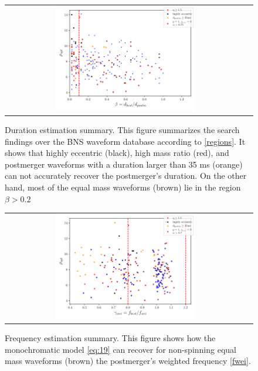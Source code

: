 \begin{figure}[hbt!]
\begin{center}
\begin{tabular}{cc}
\includegraphics[width=0.6\textwidth, angle=0]{images/Data_analysis/results/alpha_sum1.pdf}
\end{tabular}
\captionsetup{width=0.8\textwidth}
\caption[Duration estimation summary]
{Duration estimation summary. This figure summarizes the search findings over the BNS waveform database according to \ref{regions}. It shows that highly eccentric (black), high mass ratio (red), and postmerger waveforms with a duration larger than 35 ms (orange) can not accurately recover the postmerger's duration. On the other hand, most of the equal mass waveforms (brown) lie in the region $\beta>0.2$}
\label{2}
\end{center}
\end{figure}

\FloatBarrier

\begin{figure}[hbt!]
\begin{center}
\begin{tabular}{cc}
\includegraphics[width=0.6\textwidth, angle=0]{images/Data_analysis/results/alpha_sum2.pdf}
\end{tabular}
\captionsetup{width=0.8\textwidth}
\caption[Frequency estimation summary]
{Frequency estimation summary. This figure shows how the monochromatic model \ref{eq:19} can recover for non-spinning equal mass waveforms (brown) the postmerger's weighted frequency \ref{fwei}.
}
\label{3}
\end{center}
\end{figure}

